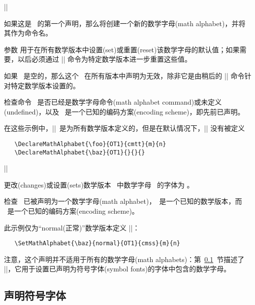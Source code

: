 \documentclass{ltxguide}[1995/11/28]
\newcommand{\heiti}{\CJKfamily{heiti}} %
\begin{document}
\begin{decl}
  |\DeclareMathAlphabet|   
                             
\end{decl}

如果这是 \ 的第一个声明，那么将创建一个新的数学字母(math alphabet)，并将其作为命令名。

参数     用于在所有数学版本中设置(set)或重置(reset)该数学字母的默认值；如果需要，以后必须通过 |\SetMathAlphabet| 命令为特定数学版本进一步重置这些值。

如果 \ 是空的，那么这个 \ 在所有版本中声明为无效，除非它是由稍后的 |\SetMathAlphabet| 命令针对特定数学版本设置的。

检查命令 \ 是否已经是数学字母命令(math alphabet command)或未定义(undefined)，以及 \ 是一个已知的编码方案(encoding scheme)，即先前已声明。

在这些示例中，|\foo|\ 是为所有数学版本定义的，但是在默认情况下，|\baz| 没有被定义
\begin{verbatim}
   \DeclareMathAlphabet{\foo}{OT1}{cmtt}{m}{n}
   \DeclareMathAlphabet{\baz}{OT1}{}{}{}
\end{verbatim}


\begin{decl}
  |\SetMathAlphabet|  \\
         \null\hfill {}   
\end{decl}

更改(changes)或设置(sets)数学版本 \ 中数学字母 \ 的字体为 。

检查 \ 已被声明为一个数学字母(math alphabet)，\ 是一个已知的数学版本，而 \ 是一个已知的编码方案(encoding scheme)。

此示例仅为“normal(正常)”数学版本定义 |\baz|：
\begin{verbatim}
   \SetMathAlphabet{\baz}{normal}{OT1}{cmss}{m}{n}
\end{verbatim}

注意，这个声明并不适用于所有的数学字母(math alphabets)：第~\ref{sec:symalph}~节描述了 |\DeclareSymbolFontAlphabet|，它用于设置已声明为符号字体(symbol fonts)的字体中包含的数学字母。

\subsection[声明符号字体]{\heiti 声明符号字体}
\label{sec:symalph}
\end{document}
